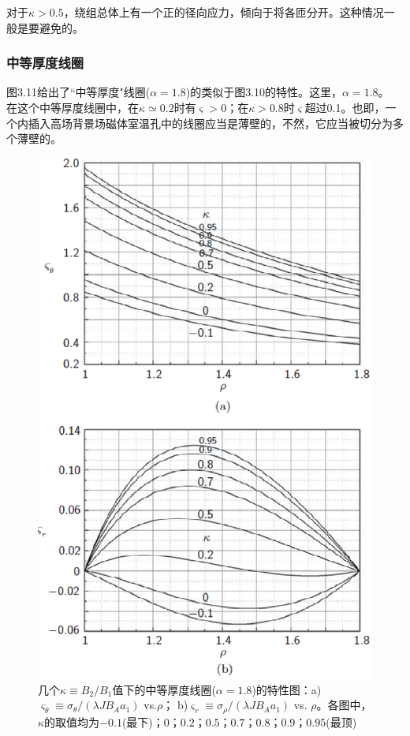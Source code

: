 对于$\kappa>0.5$，绕组总体上有一个正的径向应力，倾向于将各匝分开。这种情况一般是要避免的。

\subsubsection{中等厚度线圈}
图3.11给出了``中等厚度"线圈($\alpha=1.8$)的类似于图3.10的特性。这里，$\alpha=1.8$。
在这个中等厚度线圈中，在$\kappa\simeq 0.2$时有$\varsigma>0$；在$\kappa> 0.8$时$\varsigma$超过0.1。也即，一个内插入高场背景场磁体室温孔中的线圈应当是薄壁的，不然，它应当被切分为多个薄壁的。

\begin{figure}
  \centering
 \includegraphics[scale=0.8]{chpt3/figs/fig3.11.eps}
  \caption{几个$\kappa\equiv B_2/B_1$值下的中等厚度线圈($\alpha=1.8$)的特性图：a)$\varsigma_\theta\equiv \sigma_\theta/(\lambda J B_A a_1)$ vs.$\rho$；
  b)$\varsigma_r \equiv \sigma_\rho/(\lambda J B_A a_1)$ vs. $\rho$。各图中，$\kappa$的取值均为$-0.1$(最下)；$0$；$0.2$；$0.5$；$0.7$；$0.8$；$0.9$；$0.95$(最顶) }
\end{figure}

